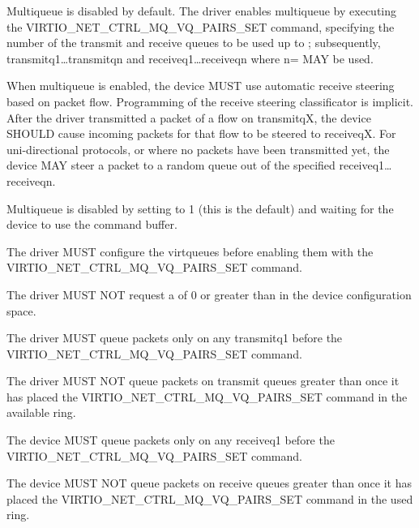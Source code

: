 Multiqueue is disabled by default. The driver enables multiqueue by
executing the VIRTIO_NET_CTRL_MQ_VQ_PAIRS_SET command, specifying
the number of the transmit and receive queues to be used up to
; subsequently,
transmitq1\ldots transmitqn and receiveq1\ldots receiveqn where
n= MAY be used.

When multiqueue is enabled, the device MUST use automatic receive steering
based on packet flow. Programming of the receive steering
classificator is implicit. After the driver transmitted a packet of a
flow on transmitqX, the device SHOULD cause incoming packets for that flow to
be steered to receiveqX. For uni-directional protocols, or where
no packets have been transmitted yet, the device MAY steer a packet
to a random queue out of the specified receiveq1\ldots receiveqn.

Multiqueue is disabled by setting  to 1 (this is
the default) and waiting for the device to use the command buffer.


The driver MUST configure the virtqueues before enabling them with the 
VIRTIO_NET_CTRL_MQ_VQ_PAIRS_SET command.

The driver MUST NOT request a  of 0 or
greater than  in the device configuration space.

The driver MUST queue packets only on any transmitq1 before the 
VIRTIO_NET_CTRL_MQ_VQ_PAIRS_SET command.

The driver MUST NOT queue packets on transmit queues greater than
 once it has placed the VIRTIO_NET_CTRL_MQ_VQ_PAIRS_SET command in the available ring.


The device MUST queue packets only on any receiveq1 before the 
VIRTIO_NET_CTRL_MQ_VQ_PAIRS_SET command.

The device MUST NOT queue packets on receive queues greater than
 once it has placed the VIRTIO_NET_CTRL_MQ_VQ_PAIRS_SET command in the used ring.

